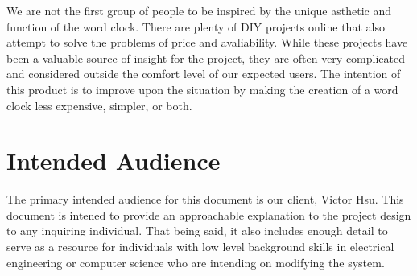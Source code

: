 \documentclass[10pt,draftclsnofoot,onecolumn]{IEEEtran}
\begin{document}
We are not the first group of people to be inspired by the unique asthetic and function of the word clock.
There are plenty of DIY projects online that also attempt to solve the problems of price and avaliability.
While these projects have been a valuable source of insight for the project, they are often very complicated and considered outside the comfort level of our expected users.
The intention of this product is to improve upon the situation by making the creation of a word clock less expensive, simpler, or both.

\section{Intended Audience}
The primary intended audience for this document is our client, Victor Hsu.
This document is intened to provide an approachable explanation to the project design to any inquiring individual.
That being said, it also includes enough detail to serve as a resource for individuals with low level background skills in electrical engineering or computer science who are intending on modifying the system.

\newpage
\end{document}
